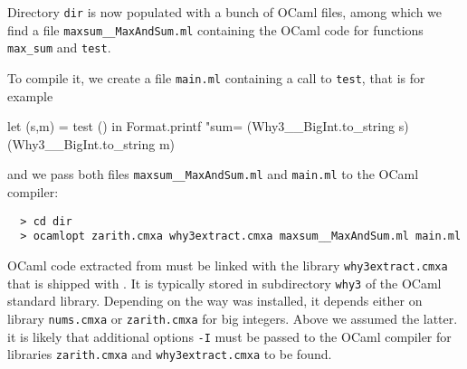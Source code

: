 Directory \texttt{dir} is now populated with a bunch of OCaml files,
among which we find a file \texttt{maxsum\_\_MaxAndSum.ml} containing
the OCaml code for functions \texttt{max\_sum} and \texttt{test}.

To compile it, we create a file \texttt{main.ml}
containing a call to \texttt{test}, that is for example
\begin{whycode}
  let (s,m) = test () in
  Format.printf "sum=%
    (Why3__BigInt.to_string s) (Why3__BigInt.to_string m)
\end{whycode}
and we pass both files \texttt{maxsum\_\_MaxAndSum.ml} and
\texttt{main.ml} to the OCaml compiler:
\begin{verbatim}
  > cd dir
  > ocamlopt zarith.cmxa why3extract.cmxa maxsum__MaxAndSum.ml main.ml
\end{verbatim}
OCaml code extracted from \why must be linked with the library
\texttt{why3extract.cmxa} that is shipped with \why. It is typically
stored in subdirectory \texttt{why3} of the OCaml standard library.
Depending on the way \why was installed, it depends either on library
\texttt{nums.cmxa} or \texttt{zarith.cmxa} for big integers. Above we
assumed the latter. it is likely that additional options \texttt{-I}
must be passed to the OCaml compiler for libraries
\texttt{zarith.cmxa} and \texttt{why3extract.cmxa} to be found.


